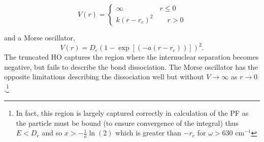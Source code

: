 \documentclass[../main.tex]{subfiles}
\begin{document}
\begin{equation}
	V(r) = \begin{cases}
		\infty \qquad\qquad\;\;\;\; r \le 0 \\
		k (r - r_e)^2 \qquad r > 0
	\end{cases}
\end{equation}

and a Morse oscillator,
\begin{equation}
	V(r) = D_e(1 - \exp\left[(-a(r- r_e))\right])^2.
\end{equation}
The truncated HO captures the region where the internuclear separation becomes negative, but fails to describe the bond dissociation. The Morse oscillator has the opposite limitations describing the dissociation well but without $V \rightarrow \infty$ as $r \rightarrow 0$.\footnote{In fact, this region is largely captured correctly in calculation of the PF as the particle must be bound (to ensure convergence of the integral) thus $E < D_e$ and so $x > -\frac{1}{a}\ln(2)$ which is greater than $ -r_e$ for $\omega > 630$ cm$^{-1}$} 
\end{document}
